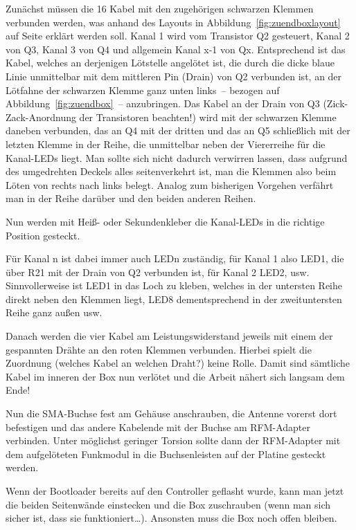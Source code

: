 \documentclass[paper=a4, parskip, numbers=noenddot, toc=listof, headsepline]{scrbook}
\begin{document}
					Zunächst müssen die 16 Kabel mit den zugehörigen schwarzen Klemmen verbunden werden, was anhand des Layouts in Abbildung~\ref{fig:zuendboxlayout} auf Seite \pageref{fig:zuendboxlayout} erklärt werden soll. Kanal 1 wird vom Transistor Q2 gesteuert, Kanal 2 von Q3, Kanal 3 von Q4 und allgemein Kanal x-1 von Qx. Entsprechend ist das Kabel, welches an derjenigen Lötstelle angelötet ist, die durch die dicke blaue Linie unmittelbar mit dem mittleren Pin (Drain) von Q2 verbunden ist, an der Lötfahne der schwarzen Klemme ganz unten links~-- bezogen auf Abbildung~\ref{fig:zuendbox}~-- anzubringen. Das Kabel an der Drain von Q3 (Zick-Zack-Anordnung der Transistoren beachten!) wird mit der schwarzen Klemme daneben verbunden, das an Q4 mit der dritten und das an Q5 schließlich mit der letzten Klemme in der Reihe, die unmittelbar neben der Viererreihe für die Kanal-LEDs liegt. Man sollte sich nicht dadurch verwirren lassen, dass aufgrund des umgedrehten Deckels alles seitenverkehrt ist, man die Klemmen also beim Löten von rechts nach links belegt. Analog zum bisherigen Vorgehen verfährt man in der Reihe darüber und den beiden anderen Reihen.

					Nun werden mit Heiß- oder Sekundenkleber die Kanal-LEDs in die richtige Position gesteckt.

					Für Kanal n ist dabei immer auch LEDn zuständig, für Kanal 1 also LED1, die über R21 mit der Drain von Q2 verbunden ist, für Kanal 2 LED2, usw. Sinnvollerweise ist LED1 in das Loch zu kleben, welches in der untersten Reihe direkt neben den Klemmen liegt, LED8 dementsprechend in der zweituntersten Reihe ganz außen usw.

					Danach werden die vier Kabel am Leistungswiderstand jeweils mit einem der gespannten Drähte an den roten Klemmen verbunden. Hierbei spielt die Zuordnung (welches Kabel an welchen Draht?) keine Rolle. Damit sind sämtliche Kabel im inneren der Box nun verlötet und die Arbeit nähert sich langsam dem Ende!

					Nun die SMA-Buchse fest am Gehäuse anschrauben, die Antenne vorerst dort befestigen und das andere Kabelende mit der Buchse am RFM-Adapter verbinden. Unter möglichst geringer Torsion sollte dann der RFM-Adapter mit dem aufgelöteten Funkmodul in die Buchsenleisten auf der Platine gesteckt werden.

					Wenn der Bootloader bereits auf den Controller geflasht wurde, kann man jetzt die beiden Seitenwände einstecken und die Box zuschrauben (wenn man sich sicher ist, dass sie funktioniert\dots). Ansonsten muss die Box noch offen bleiben.
\end{document}
